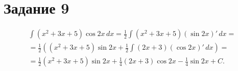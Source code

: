 \section{Задание 9}
\begin{multline*}
    \int (x^2+3x+5)\cos 2x \, dx = \frac{1}{2} \int (x^2+3x+5)(\sin 2x)' \,
    dx=\\ = \frac{1}{2}\left( (x^2+3x+5)\sin 2x + \frac{1}{2} \int (2x+3)(\cos 2x)' \,
    dx \right) = \\= \frac{1}{2} (x^2+3x+5) \sin 2x + \frac{1}{4} (2x+3) \cos 2x -
    \frac{1}{4} \sin 2x + C.
\end{multline*}
